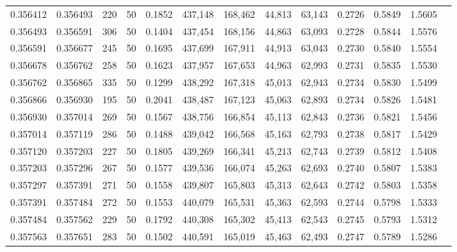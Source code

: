 \begin{tabular}{rrrrrrrrrrrrr}
0.356412 & 0.356493 &   220 &  50 &                                     0.1852 & 437,148 & 168,462 &  44,813 &  63,143 & 0.2726 & 0.5849 & 1.5605 \\
0.356493 & 0.356591 &   306 &  50 &                                     0.1404 & 437,454 & 168,156 &  44,863 &  63,093 & 0.2728 & 0.5844 & 1.5576 \\
0.356591 & 0.356677 &   245 &  50 &                                     0.1695 & 437,699 & 167,911 &  44,913 &  63,043 & 0.2730 & 0.5840 & 1.5554 \\
0.356678 & 0.356762 &   258 &  50 &                                     0.1623 & 437,957 & 167,653 &  44,963 &  62,993 & 0.2731 & 0.5835 & 1.5530 \\
0.356762 & 0.356865 &   335 &  50 &                                     0.1299 & 438,292 & 167,318 &  45,013 &  62,943 & 0.2734 & 0.5830 & 1.5499 \\
0.356866 & 0.356930 &   195 &  50 &                                     0.2041 & 438,487 & 167,123 &  45,063 &  62,893 & 0.2734 & 0.5826 & 1.5481 \\
0.356930 & 0.357014 &   269 &  50 &                                     0.1567 & 438,756 & 166,854 &  45,113 &  62,843 & 0.2736 & 0.5821 & 1.5456 \\
0.357014 & 0.357119 &   286 &  50 &                                     0.1488 & 439,042 & 166,568 &  45,163 &  62,793 & 0.2738 & 0.5817 & 1.5429 \\
0.357120 & 0.357203 &   227 &  50 &                                     0.1805 & 439,269 & 166,341 &  45,213 &  62,743 & 0.2739 & 0.5812 & 1.5408 \\
0.357203 & 0.357296 &   267 &  50 &                                     0.1577 & 439,536 & 166,074 &  45,263 &  62,693 & 0.2740 & 0.5807 & 1.5383 \\
0.357297 & 0.357391 &   271 &  50 &                                     0.1558 & 439,807 & 165,803 &  45,313 &  62,643 & 0.2742 & 0.5803 & 1.5358 \\
0.357391 & 0.357484 &   272 &  50 &                                     0.1553 & 440,079 & 165,531 &  45,363 &  62,593 & 0.2744 & 0.5798 & 1.5333 \\
0.357484 & 0.357562 &   229 &  50 &                                     0.1792 & 440,308 & 165,302 &  45,413 &  62,543 & 0.2745 & 0.5793 & 1.5312 \\
0.357563 & 0.357651 &   283 &  50 &                                     0.1502 & 440,591 & 165,019 &  45,463 &  62,493 & 0.2747 & 0.5789 & 1.5286 \\

\end{tabular}
